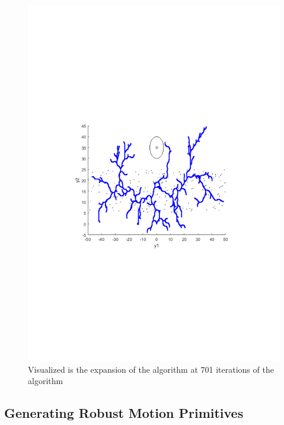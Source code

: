 \begin{figure}[!t]
\begin{minipage}[c]{.8\columnwidth}
    \includegraphics[width=1\columnwidth, trim={0cm, 10cm, 0cm, 9cm}, clip]{figures/experiments/rrtfunnel-701samples-dyn.pdf}
  \caption[The expansion of the \rrtfunnel algorithm at 1, and 101 iterations]{Visualized is the expansion of the \rrtfunnel algorithm at 701 iterations of the algorithm}
  \end{minipage}
\end{figure}

\subsection{Generating Robust Motion Primitives}


